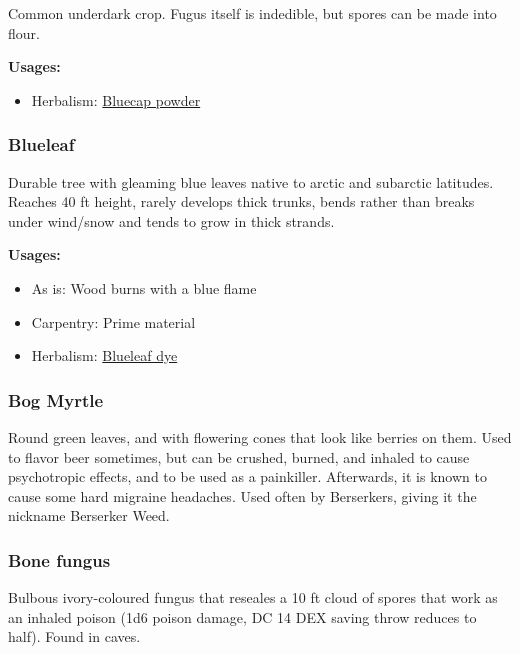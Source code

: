 Common underdark crop. Fugus itself is indedible, but spores can be made into flour.

\vspace{5mm}

\textbf{Usages:}

\begin{itemize}[noitemsep]
\item[] Herbalism: \hyperref[Bluecap powder]{Bluecap powder}
\end{itemize}

\subsubsection{Blueleaf}
\label{Blueleaf}

Durable tree with gleaming blue leaves native to arctic and subarctic latitudes. Reaches 40 ft height, rarely develops thick trunks, bends rather than breaks under wind/snow and tends to grow in thick strands.

\vspace{5mm}

\textbf{Usages:}

\begin{itemize}[noitemsep]
\item[] As is: Wood burns with a blue flame
\item[] Carpentry: Prime material
\item[] Herbalism: \hyperref[Blueleaf dye]{Blueleaf dye}
\end{itemize}

\subsubsection{Bog Myrtle}
\label{bog_myrtle}

Round green leaves, and with flowering cones that look like berries on them. Used to flavor beer sometimes, but can be crushed, burned, and inhaled to cause psychotropic effects, and to be used as a painkiller. Afterwards, it is known to cause some hard migraine headaches. Used often by Berserkers, giving it the nickname Berserker Weed.

\subsubsection{Bone fungus}
\label{Bone fungus}

Bulbous ivory-coloured fungus that reseales a 10 ft cloud of spores that work as an inhaled poison (1d6 poison damage, DC 14 DEX saving throw reduces to half). Found in caves.

